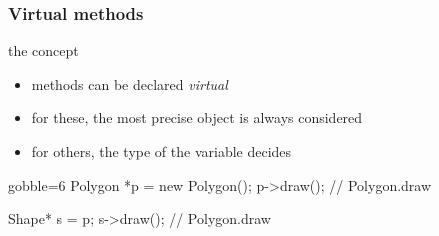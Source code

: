 \begin{frame}[fragile]
  \frametitle{Virtual methods}
  \begin{block}{the concept}
    \begin{itemize}
    \item methods can be declared {\it virtual}
    \item for these, the most precise object is always considered
    \item for others, the type of the variable decides
    \end{itemize}
  \end{block}
  \begin{multicols}{2}
    \begin{cppcode*}{gobble=6}
      Polygon *p = new Polygon();
      p->draw(); // Polygon.draw
      
      Shape* s = p;
      s->draw();  // Polygon.draw
    \end{cppcode*}
    \columnbreak
    \center
  \end{multicols}    
\end{frame}

